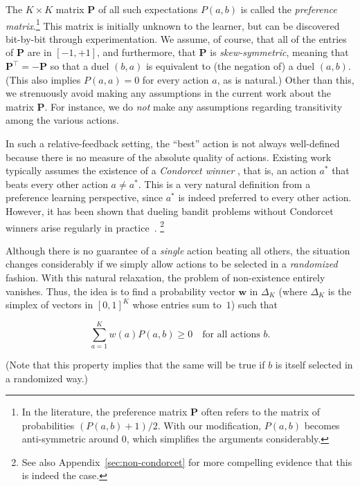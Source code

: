 The $K\times K$ matrix $\mathbf{P}$ of all such expectations ${P({a},{b})}$ is called the
\emph{preference matrix}.\footnote{In the literature, the preference matrix $\mathbf{P}$ often refers to the matrix of probabilities $({P({a},{b})}+1)/2$. With our modification, ${P({a},{b})}$ becomes anti-symmetric around $0$, which simplifies the arguments considerably.} This matrix is initially unknown to the learner, but can be discovered bit-by-bit through experimentation. We assume, of course, that all of the entries of $\mathbf{P}$ are in $[-1,+1]$, and furthermore, that $\mathbf{P}$ is {\em skew-symmetric}, meaning that ${\mathbf{P}^{\top}}=-\mathbf{P}$ so that a duel $(b,a)$ is equivalent to (the negation of) a duel $(a,b)$. (This also implies ${P({a},{a})}=0$ for every action $a$, as is natural.) Other than this, we strenuously avoid making any assumptions in the current work about the matrix $\mathbf{P}$.
For instance, we do {\em not\/} make any assumptions regarding transitivity among the various actions.

In such a relative-feedback setting, the ``best'' action is not always well-defined because there is no measure of the absolute quality of actions. Existing work typically assumes the existence of a \emph{Condorcet
winner} \citep{Urvoy:2013,RUCB2014}, that is, an action ${a^*}$ that beats every other action $a\neq {a^*}$. This is a very natural definition from a preference learning perspective, since ${a^*}$ is indeed preferred to every other action. However, it has been shown that dueling bandit problems without Condorcet winners arise regularly in practice~\citep{RCS2014}.
\footnote{See also Appendix~\ref{sec:non-condorcet} for more compelling evidence that this is indeed the case.}

Although there is no guarantee of a {\em single\/} action beating all others, the situation changes considerably if we simply allow actions to be selected in a {\em randomized\/} fashion. With this natural relaxation, the problem of non-existence entirely vanishes. Thus, the idea is to find a probability vector $\mathbf{w}$ in ${\Delta_{K}}$
(where ${\Delta_{K}}$ is the simplex of vectors in $[0,1]^K$ whose entries sum to~$1$) such that

\begin{equation}  \label{eqn:v1}
\textstyle  \sum_{a=1}^K  w(a) {P({a},{b})} \geq 0
\quad \text{for all actions $b$}.
\end{equation}

(Note that this property implies that the same will be true if $b$ is itself selected in a randomized way.)


